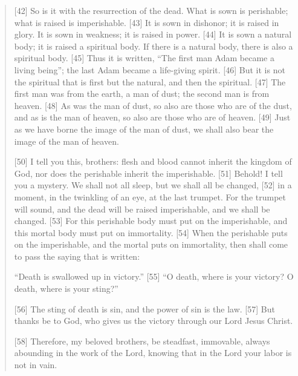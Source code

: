\begin{quote}
    [42] So is it with the resurrection of the dead. What is sown is perishable; what is raised is imperishable. [43] It is sown in dishonor; it is raised in glory. It is sown in weakness; it is raised in power. [44] It is sown a natural body; it is raised a spiritual body. If there is a natural body, there is also a spiritual body. [45] Thus it is written, “The first man Adam became a living being”; the last Adam became a life-giving spirit. [46] But it is not the spiritual that is first but the natural, and then the spiritual. [47] The first man was from the earth, a man of dust; the second man is from heaven. [48] As was the man of dust, so also are those who are of the dust, and as is the man of heaven, so also are those who are of heaven. [49] Just as we have borne the image of the man of dust, we shall also bear the image of the man of heaven.

    [50] I tell you this, brothers: flesh and blood cannot inherit the kingdom of God, nor does the perishable inherit the imperishable. [51] Behold! I tell you a mystery. We shall not all sleep, but we shall all be changed, [52] in a moment, in the twinkling of an eye, at the last trumpet. For the trumpet will sound, and the dead will be raised imperishable, and we shall be changed. [53] For this perishable body must put on the imperishable, and this mortal body must put on immortality. [54] When the perishable puts on the imperishable, and the mortal puts on immortality, then shall come to pass the saying that is written:

      “Death is swallowed up in victory.”
      [55] “O death, where is your victory?
          O death, where is your sting?”


        [56] The sting of death is sin, and the power of sin is the law. [57] But thanks be to God, who gives us the victory through our Lord Jesus Christ.

    [58] Therefore, my beloved brothers, be steadfast, immovable, always abounding in the work of the Lord, knowing that in the Lord your labor is not in vain.
  \end{quote}
